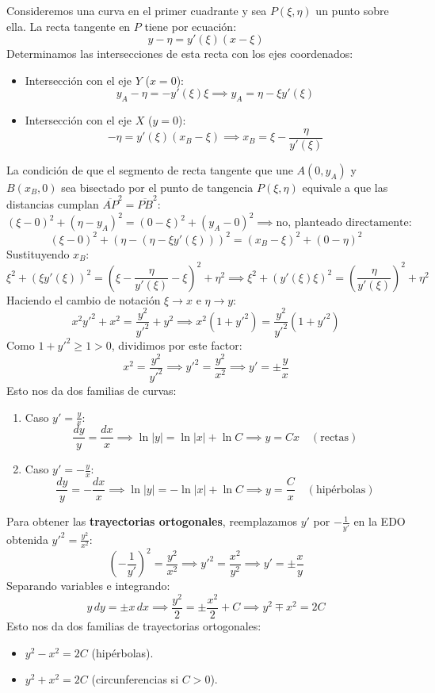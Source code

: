 \documentclass[12pt,letterpaper]{article}
\begin{document}
Consideremos una curva en el primer cuadrante y sea $P(\xi, \eta)$ un punto sobre ella. La recta tangente en $P$ tiene por ecuación:
\[
  y - \eta = y'(\xi)(x - \xi)
\]
Determinamos las intersecciones de esta recta con los ejes coordenados:
\begin{itemize}
  \item Intersección con el eje $Y$ ($x = 0$):
  \[
    y_A - \eta = -y'(\xi)\xi \implies y_A = \eta - \xi y'(\xi)
  \]
  \item Intersección con el eje $X$ ($y = 0$):
  \[
    -\eta = y'(\xi)(x_B - \xi) \implies x_B = \xi - \frac{\eta}{y'(\xi)}
  \]
\end{itemize}
La condición de que el segmento de recta tangente que une $A(0, y_A)$ y $B(x_B, 0)$ sea bisectado por el punto de tangencia $P(\xi, \eta)$ equivale a que las distancias cumplan $\overline{AP}^2 = \overline{PB}^2$:
\[
  (\xi - 0)^2 + (\eta - y_A)^2 = (0 - \xi)^2 + (y_A - 0)^2 \implies \text{no, planteado directamente:}
\]
\[
  (\xi - 0)^2 + (\eta - (\eta - \xi y'(\xi)))^2 = (x_B - \xi)^2 + (0 - \eta)^2
\]
Sustituyendo $x_B$:
\[
  \xi^2 + (\xi y'(\xi))^2 = \left( \xi - \frac{\eta}{y'(\xi)} - \xi \right)^2 + \eta^2 \implies \xi^2 + (y'(\xi)\xi)^2 = \left( \frac{\eta}{y'(\xi)} \right)^2 + \eta^2
\]
Haciendo el cambio de notación $\xi \to x$ e $\eta \to y$:
\[
  x^2 y'^2 + x^2 = \frac{y^2}{y'^2} + y^2 \implies x^2(1 + y'^2) = \frac{y^2}{y'^2}(1 + y'^2)
\]
Como $1 + y'^2 \ge 1 > 0$, dividimos por este factor:
\[
  x^2 = \frac{y^2}{y'^2} \implies y'^2 = \frac{y^2}{x^2} \implies y' = \pm \frac{y}{x}
\]
Esto nos da dos familias de curvas:
\begin{enumerate}[label=\alph*)]
  \item Caso $y' = \frac{y}{x}$:
  \[
    \frac{dy}{y} = \frac{dx}{x} \implies \ln|y| = \ln|x| + \ln C \implies y = Cx \quad (\text{rectas})
  \]
  \item Caso $y' = -\frac{y}{x}$:
  \[
    \frac{dy}{y} = -\frac{dx}{x} \implies \ln|y| = -\ln|x| + \ln C \implies y = \frac{C}{x} \quad (\text{hipérbolas})
  \]
\end{enumerate}

Para obtener las \textbf{trayectorias ortogonales}, reemplazamos $y'$ por $-\frac{1}{y'}$ en la EDO obtenida $y'^2 = \frac{y^2}{x^2}$:
\[
  \left( -\frac{1}{y'} \right)^2 = \frac{y^2}{x^2} \implies y'^2 = \frac{x^2}{y^2} \implies y' = \pm \frac{x}{y}
\]
Separando variables e integrando:
\[
  y\,dy = \pm x\,dx \implies \frac{y^2}{2} = \pm \frac{x^2}{2} + C \implies y^2 \mp x^2 = 2C
\]
Esto nos da dos familias de trayectorias ortogonales:
\begin{itemize}
  \item $y^2 - x^2 = 2C$ (hipérbolas).
  \item $y^2 + x^2 = 2C$ (circunferencias si $C > 0$).
\end{itemize}
\end{document}
